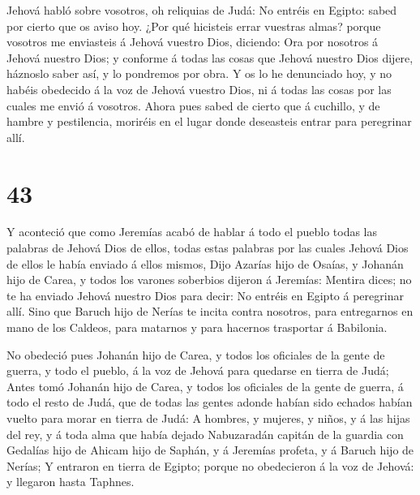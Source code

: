  Jehová habló sobre vosotros, oh reliquias de Judá: No
entréis en Egipto: sabed por cierto que os aviso hoy.  ¿Por
qué hicisteis errar vuestras almas? porque vosotros me enviasteis á
Jehová vuestro Dios, diciendo: Ora por nosotros á Jehová nuestro Dios; y
conforme á todas las cosas que Jehová nuestro Dios dijere, háznoslo
saber así, y lo pondremos por obra.  Y os lo he denunciado
hoy, y no habéis obedecido á la voz de Jehová vuestro Dios, ni á todas
las cosas por las cuales me envió á vosotros.  Ahora pues
sabed de cierto que á cuchillo, y de hambre y pestilencia, moriréis en
el lugar donde deseasteis entrar para peregrinar allí.

\hypertarget{section-42}{%
\section{43}\label{section-42}}

 Y aconteció que como Jeremías acabó de hablar á todo el
pueblo todas las palabras de Jehová Dios de ellos, todas estas palabras
por las cuales Jehová Dios de ellos le había enviado á ellos mismos,
 Dijo Azarías hijo de Osaías, y Johanán hijo de Carea, y
todos los varones soberbios dijeron á Jeremías: Mentira dices; no te ha
enviado Jehová nuestro Dios para decir: No entréis en Egipto á
peregrinar allí.  Sino que Baruch hijo de Nerías te incita
contra nosotros, para entregarnos en mano de los Caldeos, para matarnos
y para hacernos trasportar á Babilonia.

 No obedeció pues Johanán hijo de Carea, y todos los
oficiales de la gente de guerra, y todo el pueblo, á la voz de Jehová
para quedarse en tierra de Judá;  Antes tomó Johanán hijo de
Carea, y todos los oficiales de la gente de guerra, á todo el resto de
Judá, que de todas las gentes adonde habían sido echados habían vuelto
para morar en tierra de Judá:  A hombres, y mujeres, y
niños, y á las hijas del rey, y á toda alma que había dejado Nabuzaradán
capitán de la guardia con Gedalías hijo de Ahicam hijo de Saphán, y á
Jeremías profeta, y á Baruch hijo de Nerías;  Y entraron en
tierra de Egipto; porque no obedecieron á la voz de Jehová: y llegaron
hasta Taphnes.

